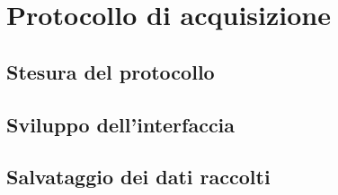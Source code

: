 \chapter{Protocollo di acquisizione}

\section{Stesura del protocollo}
\section{Sviluppo dell'interfaccia}
\section{Salvataggio dei dati raccolti}

\clearpage